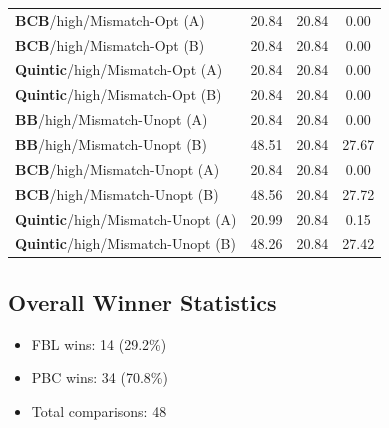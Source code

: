 \documentclass[11pt,a4paper]{article}
\begin{document}
\begin{longtable}{p{5cm}ccc}
\midrule
\textbf{BCB}/high/Mismatch-Opt (A) & \textcolor{bestcolor}{20.84} & 20.84 & 0.00 \\
\textbf{BCB}/high/Mismatch-Opt (B) & \textcolor{bestcolor}{20.84} & 20.84 & 0.00 \\
\midrule
\textbf{Quintic}/high/Mismatch-Opt (A) & \textcolor{bestcolor}{20.84} & 20.84 & 0.00 \\
\textbf{Quintic}/high/Mismatch-Opt (B) & \textcolor{bestcolor}{20.84} & 20.84 & 0.00 \\
\midrule
\textbf{BB}/high/Mismatch-Unopt (A) & \textcolor{bestcolor}{20.84} & 20.84 & 0.00 \\
\textbf{BB}/high/Mismatch-Unopt (B) & 48.51 & \textcolor{bestcolor}{20.84} & 27.67 \\
\midrule
\textbf{BCB}/high/Mismatch-Unopt (A) & \textcolor{bestcolor}{20.84} & 20.84 & 0.00 \\
\textbf{BCB}/high/Mismatch-Unopt (B) & 48.56 & \textcolor{bestcolor}{20.84} & 27.72 \\
\midrule
\textbf{Quintic}/high/Mismatch-Unopt (A) & 20.99 & \textcolor{bestcolor}{20.84} & 0.15 \\
\textbf{Quintic}/high/Mismatch-Unopt (B) & 48.26 & \textcolor{bestcolor}{20.84} & 27.42 \\
\bottomrule
\end{longtable}

\subsection{Overall Winner Statistics}

\begin{itemize}
  \item FBL wins: 14 (29.2\%)
  \item PBC wins: 34 (70.8\%)
  \item Total comparisons: 48
\end{itemize}
\end{document}
